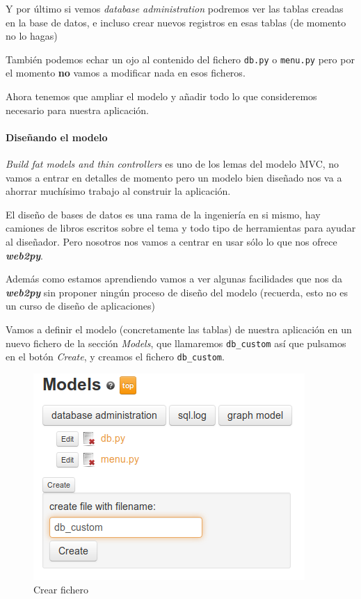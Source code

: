 \documentclass[
  12pt,
  spanish,
]{article}
\begin{document}
Y por último si vemos \emph{database administration} podremos ver las
tablas creadas en la base de datos, e incluso crear nuevos registros en
esas tablas (de momento no lo hagas)

También podemos echar un ojo al contenido del fichero \texttt{db.py} o
\texttt{menu.py} pero por el momento \textbf{no} vamos a modificar nada
en esos ficheros.

Ahora tenemos que ampliar el modelo y añadir todo lo que consideremos
necesario para nuestra aplicación.

\hypertarget{diseuxf1ando-el-modelo}{%
\paragraph{Diseñando el modelo}\label{diseuxf1ando-el-modelo}}

\emph{Build fat models and thin controllers} es uno de los lemas del
modelo MVC, no vamos a entrar en detalles de momento pero un modelo bien
diseñado nos va a ahorrar muchísimo trabajo al construir la aplicación.

El diseño de bases de datos es una rama de la ingeniería en si mismo,
hay camiones de libros escritos sobre el tema y todo tipo de
herramientas para ayudar al diseñador. Pero nosotros nos vamos a centrar
en usar sólo lo que nos ofrece \textbf{\emph{web2py}}.

Además como estamos aprendiendo vamos a ver algunas facilidades que nos
da \textbf{\emph{web2py}} sin proponer ningún proceso de diseño del
modelo (recuerda, esto no es un curso de diseño de aplicaciones)

Vamos a definir el modelo (concretamente las tablas) de nuestra
aplicación en un nuevo fichero de la sección \emph{Models}, que
llamaremos \texttt{db\_custom} así que pulsamos en el botón
\emph{Create}, y creamos el fichero \texttt{db\_custom}.

\begin{figure}
\centering
\includegraphics{src/img/create_db_custom.png}
\caption{Crear fichero}
\end{figure}
\end{document}
